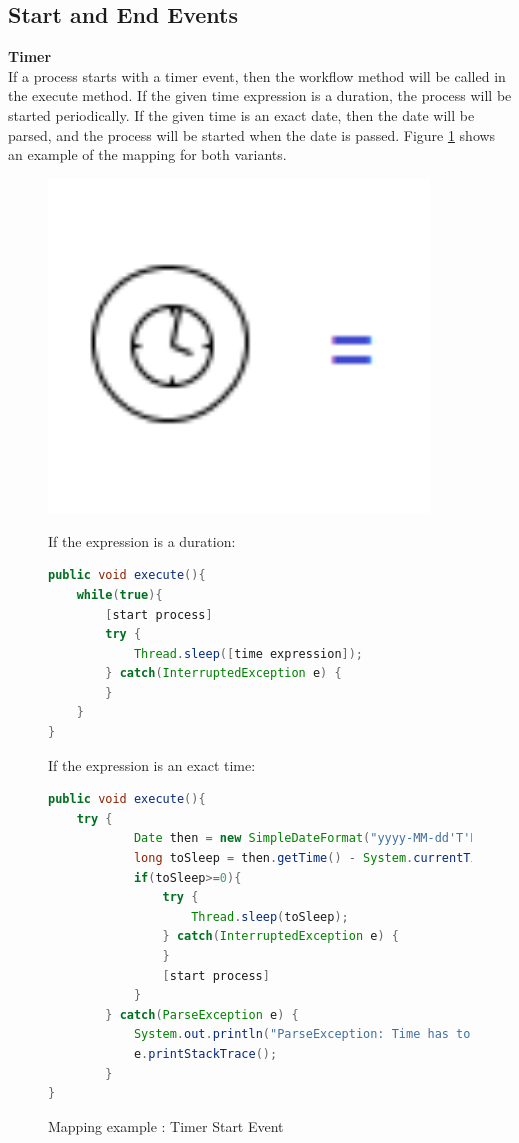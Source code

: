\subsection{Start and End Events}

\textbf{Timer}\\
If a process starts with a timer event, then the workflow method will be called in the execute method. If the given time expression is a duration, the process will be started periodically. If the given time is an exact date, then the date will be parsed, and the process will be started when the date is passed. Figure \ref{fig:timer_start} shows an example of the mapping for both variants.

\begin{figure}[h]
\begin{minipage}[c]{0.28\textwidth}
\includegraphics[width=0.9\textwidth]{images/mapping/timer_start.png}
\end{minipage}
\begin{minipage}[c]{0.72\textwidth}
If the expression is a duration:
\begin{lstlisting}[language = Java]
public void execute(){
	while(true){
		[start process]
		try {
			Thread.sleep([time expression]);
		} catch(InterruptedException e) {
		}
	}
}
\end{lstlisting}
If the expression is an exact time:
\begin{lstlisting}[language = Java]
public void execute(){
	try {
			Date then = new SimpleDateFormat("yyyy-MM-dd'T'HH:mm:ss.SSSZ").parse("2011-11-04T10:00:00.000+0100");
			long toSleep = then.getTime() - System.currentTimeMillis();
			if(toSleep>=0){
				try {
					Thread.sleep(toSleep);
				} catch(InterruptedException e) {
				}
				[start process]
			}
		} catch(ParseException e) {
			System.out.println("ParseException: Time has to be in yyyy-MM-dd'T'HH:mm:ss.SSSZ form");
			e.printStackTrace();
		}
}
\end{lstlisting}
\end{minipage}
\caption{Mapping example : Timer Start Event}%
\label{fig:timer_start}%
\end{figure}
\newpage

